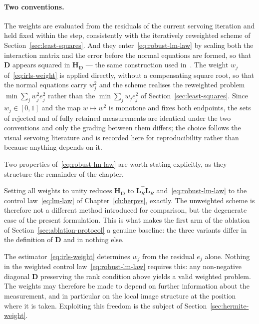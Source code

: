 \paragraph{Two conventions.}
The weights are evaluated from the residuals of the current servoing iteration
and held fixed within the step, consistently with the iteratively reweighted
scheme of Section~\ref{sec:least-squares}.
And they enter~\eqref{eq:robust-lm-law} by scaling both the interaction matrix
and the error before the normal equations are formed, so that $\mathbf{D}$
appears squared in $\mathbf{H}_{\mathbf{D}}$ --- the same construction used
in~\cite{key26}. The weight $w_{j}$ of~\eqref{eq:irls-weight} is applied
directly, without a compensating square root, so that the normal equations
carry $w_{j}^{2}$ and the scheme realises the reweighted problem
$\min\sum_{j}w_{j}^{2}e_{j}^{2}$ rather than the
$\min\sum_{j}w_{j}e_{j}^{2}$ of Section~\ref{sec:least-squares}.
Since $w_{j}\in[0,1]$ and the map $w\mapsto w^{2}$ is monotone and fixes both
endpoints, the sets of rejected and of fully retained measurements are
identical under the two conventions and only the grading between them differs;
the choice follows the visual servoing literature and is recorded here for
reproducibility rather than because anything depends on it.

Two properties of~\eqref{eq:robust-lm-law} are worth stating explicitly, as
they structure the remainder of the chapter.

\begin{remark}[The unweighted scheme is the special case $\mathbf{D}=\mathbf{I}$]
\label{rem:baseline}
Setting all weights to unity reduces $\mathbf{H}_{\mathbf{D}}$ to
$\mathbf{L}_{R}^{\top}\mathbf{L}_{R}$ and~\eqref{eq:robust-lm-law} to the
control law~\eqref{eq:lm-law} of Chapter~\ref{ch:herpvs}, exactly. The
unweighted scheme is therefore not a different method introduced for
comparison, but the degenerate case of the present formulation. This is what
makes the first arm of the ablation of Section~\ref{sec:ablation-protocol} a
genuine baseline: the three variants differ in the definition of $\mathbf{D}$
and in nothing else.
\end{remark}

\begin{remark}
\label{rem:weight-information}
The estimator~\eqref{eq:irls-weight} determines $w_{j}$ from the residual
$e_{j}$ alone. Nothing in the weighted control law~\eqref{eq:robust-lm-law}
requires this: any non-negative diagonal $\mathbf{D}$ preserving the rank
condition above yields a valid weighted problem. The weights may therefore be
made to depend on further information about the measurement, and in particular
on the local image structure at the position where it is taken. Exploiting
this freedom is the subject of Section~\ref{sec:hermite-weight}.
\end{remark}

